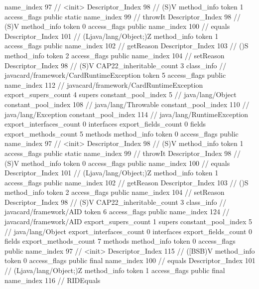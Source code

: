 {{{{{					name_index	97		// <init>
					Descriptor_Index	98		// (S)V
				}
				method_info {
					token	1
					access_flags	public static
					name_index	99		// throwIt
					Descriptor_Index	98		// (S)V
				}
				method_info {
					token	0
					access_flags	public
					name_index	100		// equals
					Descriptor_Index	101		// (Ljava/lang/Object;)Z
				}
				method_info {
					token	1
					access_flags	public
					name_index	102		// getReason
					Descriptor_Index	103		// ()S
				}
				method_info {
					token	2
					access_flags	public
					name_index	104		// setReason
					Descriptor_Index	98		// (S)V
				}
			}
			CAP22_inheritable_count	3
		}
		class_info {		// javacard/framework/CardRuntimeException
			token	5
			access_flags	public
			name_index	112		// javacard/framework/CardRuntimeException
			export_supers_count	4
			supers {
				constant_pool_index	5		// java/lang/Object
				constant_pool_index	108		// java/lang/Throwable
				constant_pool_index	110		// java/lang/Exception
				constant_pool_index	114		// java/lang/RuntimeException
			}
			export_interfaces_count	0
			interfaces {
			}
			export_fields_count	0
			fields {
			}
			export_methods_count	5
			methods {
				method_info {
					token	0
					access_flags	public
					name_index	97		// <init>
					Descriptor_Index	98		// (S)V
				}
				method_info {
					token	1
					access_flags	public static
					name_index	99		// throwIt
					Descriptor_Index	98		// (S)V
				}
				method_info {
					token	0
					access_flags	public
					name_index	100		// equals
					Descriptor_Index	101		// (Ljava/lang/Object;)Z
				}
				method_info {
					token	1
					access_flags	public
					name_index	102		// getReason
					Descriptor_Index	103		// ()S
				}
				method_info {
					token	2
					access_flags	public
					name_index	104		// setReason
					Descriptor_Index	98		// (S)V
				}
			}
			CAP22_inheritable_count	3
		}
		class_info {		// javacard/framework/AID
			token	6
			access_flags	public
			name_index	124		// javacard/framework/AID
			export_supers_count	1
			supers {
				constant_pool_index	5		// java/lang/Object
			}
			export_interfaces_count	0
			interfaces {
			}
			export_fields_count	0
			fields {
			}
			export_methods_count	7
			methods {
				method_info {
					token	0
					access_flags	public
					name_index	97		// <init>
					Descriptor_Index	115		// ([BSB)V
				}
				method_info {
					token	0
					access_flags	public final
					name_index	100		// equals
					Descriptor_Index	101		// (Ljava/lang/Object;)Z
				}
				method_info {
					token	1
					access_flags	public final
					name_index	116		// RIDEquals
}}}}}

